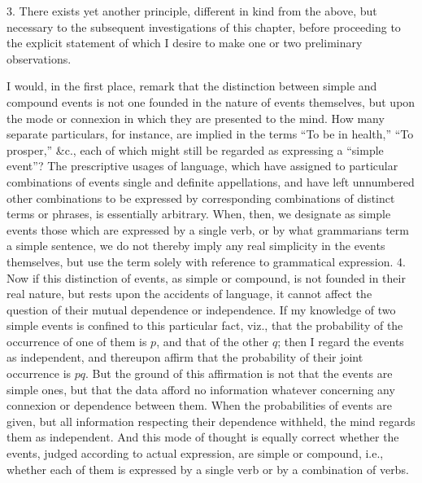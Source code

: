 \documentclass[oneside]{book}
\begin{document}
3. There exists yet another principle, different in kind from
the above, but necessary to the subsequent investigations of this
chapter, before proceeding to the explicit statement of which I
desire to make one or two preliminary observations.

I would, in the first place, remark that the distinction between
simple and compound events is not one founded in the
nature of events themselves, but upon the mode or connexion in
which they are presented to the mind. How many separate particulars,
for instance, are implied in the terms ``To be in health,''
``To prosper,'' \&c., each of which might still be regarded as
expressing a ``simple event''? The prescriptive usages of language,
which have assigned to particular combinations of events
single and definite appellations, and have left unnumbered other
combinations to be expressed by corresponding combinations of
distinct terms or phrases, is essentially arbitrary. When, then,
we designate as simple events those which are expressed by a
single verb, or by what grammarians term a simple sentence, we
do not thereby imply any real simplicity in the events themselves,
but use the term solely with reference to grammatical
expression.
4. Now if this distinction of events, as simple or compound, is
not founded in their real nature, but rests upon the accidents of
language, it cannot affect the question of their mutual dependence
or independence. If my knowledge of two simple events is
confined to this particular fact, viz., that the probability of the
occurrence of one of them is $p$, and that of the other $q$; then I regard
the events as independent, and thereupon affirm that the
probability of their joint occurrence is $pq$. But the ground of
this affirmation is not that the events are simple ones, but that
the data afford no information whatever concerning any connexion
or dependence between them. When the probabilities of events
are given, but all information respecting their dependence withheld,
the mind regards them as independent. And this mode of
thought is equally correct whether the events, judged according
to actual expression, are simple or compound, i.e., whether each
of them is expressed by a single verb or by a combination of
verbs.
\end{document}

